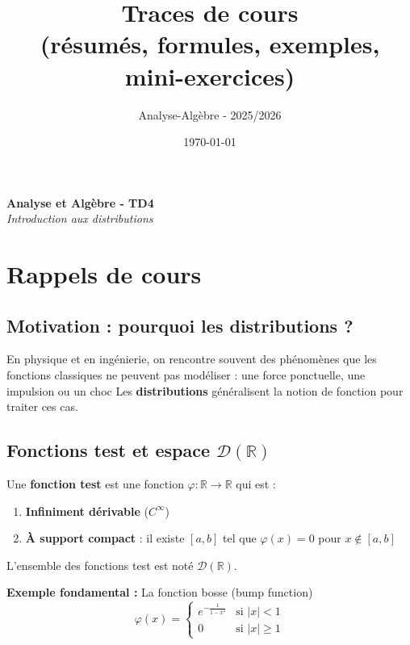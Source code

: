 \documentclass[11pt,a4paper]{report}
\title{\textbf{Traces de cours}\\\large (résumés, formules, exemples, mini-exercices)}
\author{ Analyse-Algèbre - 2025/2026 }
\date{\today}
\newcommand{\Distr}{\mathcal{D}}
\begin{document}
\begin{center}
    {\LARGE \textbf{Analyse et Algèbre - TD4}}\\[1em]
    {\large \textit{Introduction aux distributions}}
\end{center}

\section*{Rappels de cours}

\subsection*{Motivation : pourquoi les distributions ?}

En physique et en ingénierie, on rencontre souvent des phénomènes que les fonctions classiques ne peuvent pas modéliser : une force ponctuelle, une impulsion ou un choc
Les \textbf{distributions} généralisent la notion de fonction pour traiter ces cas.

\subsection*{Fonctions test et espace $\Distr(\mathbb{R})$}

\begin{tcolorbox}[colback=ThemeLight, colframe=Theme, title=Définition : Fonction test]
Une \textbf{fonction test} est une fonction $\varphi : \mathbb{R} \to \mathbb{R}$ qui est :
\begin{enumerate}
    \item \textbf{Infiniment dérivable} ($C^\infty$)
    \item \textbf{À support compact} : il existe $[a,b]$ tel que $\varphi(x) = 0$ pour $x \notin [a,b]$
\end{enumerate}
L'ensemble des fonctions test est noté $\Distr(\mathbb{R})$.
\end{tcolorbox}

\textbf{Exemple fondamental :} La fonction bosse (bump function)
\[
\varphi(x) = \begin{cases}
e^{-\frac{1}{1-x^2}} & \text{si } |x| < 1 \\
0 & \text{si } |x| \geq 1
\end{cases}
\]

\begin{center}
\end{center}
\end{document}
